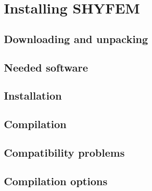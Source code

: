 \documentclass{report}
\newcommand{\todo}[1]{This section still has to be written by #1}
\begin{document}




\chapter{Installing SHYFEM}

	\section{Downloading and unpacking}
	

	\section{Needed software}
	

	\section{Installation}
	

	\section{Compilation}
	

	\section{Compatibility problems}
	

	\section{Compilation options}
	
\end{document}
